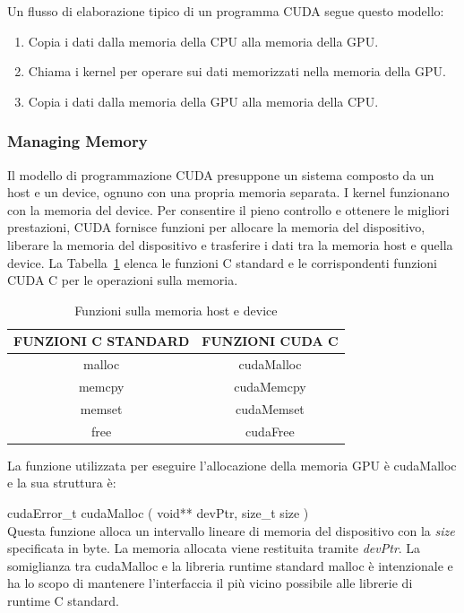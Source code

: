 Un flusso di elaborazione tipico di un programma CUDA segue questo modello:
\begin{enumerate}
	\item Copia i dati dalla memoria della CPU alla memoria della GPU.
	\item Chiama i kernel per operare sui dati memorizzati nella memoria della GPU.
	\item Copia i dati dalla memoria della GPU alla memoria della CPU.
\end{enumerate}
\subsubsection{Managing Memory}
\label{sec:managing_memory}
Il modello di programmazione CUDA presuppone un sistema composto da un host e un device, ognuno con una propria memoria separata. I kernel funzionano con la memoria del device. Per consentire il pieno controllo e ottenere le migliori prestazioni, CUDA fornisce funzioni per allocare la memoria del dispositivo, liberare la memoria del dispositivo e trasferire i dati tra la memoria host e quella device. La Tabella~\ref{table:Host and Device Memory Functions} elenca le funzioni C standard e le corrispondenti funzioni CUDA C per le operazioni sulla memoria.
\begin{table}[h!]
	\centering
	\begin{tabular}{c c} 
		\hline
		FUNZIONI C STANDARD & FUNZIONI CUDA C\\
		\hline
		malloc & cudaMalloc\\
		\hline
		memcpy & cudaMemcpy\\
		\hline
		memset & cudaMemset\\
		\hline
		free & cudaFree\\
		\hline
	\end{tabular}
	\caption{Funzioni sulla memoria host e device}
	\label{table:Host and Device Memory Functions}
\end{table}
La funzione utilizzata per eseguire l'allocazione della memoria GPU è cudaMalloc e la sua struttura è:

cudaError\_t cudaMalloc ( void** devPtr, size\_t size )\\
Questa funzione alloca un intervallo lineare di memoria del dispositivo con la \emph{size} specificata in byte. La memoria allocata viene restituita tramite \emph{devPtr}. La somiglianza tra cudaMalloc e la libreria runtime standard malloc è intenzionale e ha lo scopo di mantenere l'interfaccia il più vicino possibile alle librerie di runtime C standard.

